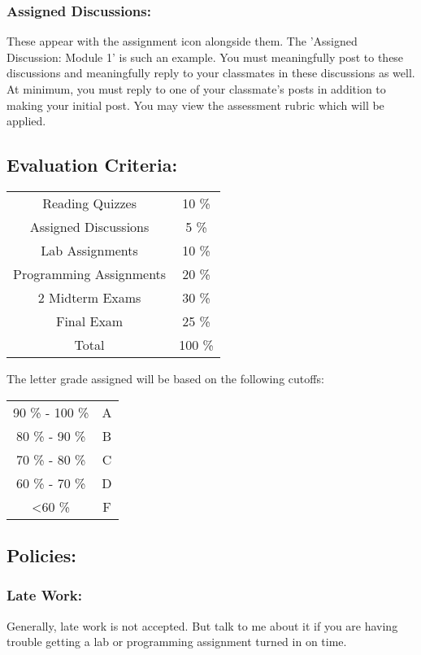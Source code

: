\documentclass{article}
\begin{document}
\subsubsection{Assigned Discussions:}

These appear with the assignment icon alongside them.  The 'Assigned Discussion: Module 1' is such an example.  You must meaningfully post to these discussions and meaningfully reply to your classmates in these discussions as well.  At minimum, you must reply to one of your classmate's posts in addition to making your initial post.  You may view the assessment rubric which will be applied.

\subsection{Evaluation Criteria:}

\begin{tabular}{cc}
Reading Quizzes & 10 \% \\
Assigned Discussions	& 5 \% \\
Lab Assignments	& 10 \% \\
Programming Assignments & 20 \% \\
2 Midterm Exams   & 30 \% \\
Final Exam & 25 \% \\
Total 	& 100 \% \\
\end{tabular}

The letter grade assigned will be based on the following cutoffs:

\begin{tabular}{cc}
90 \% - 100 \% & A \\
80 \% - 90 \% & B \\
70 \% - 80 \% & C \\
60 \% - 70 \% & D \\
\textless 60 \% & F
\end{tabular}

\subsection{Policies:}
\subsubsection{Late Work:}

Generally, late work is not accepted.  But talk to me about it if you are having trouble getting a lab or programming assignment turned in on time.
\end{document}
